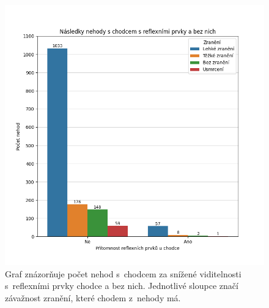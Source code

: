 \documentclass[a4paper, 11pt]{article}
\begin{document}
\begin{figure}[H]
    \centering
    \includegraphics[width=1.0\textwidth]{fig.png}
    \caption{Graf znázorňuje počet nehod s~chodcem za snížené viditelnosti s~reflexními prvky chodce a bez nich. Jednotlivé sloupce značí závažnost zranění, které chodem z~nehody má.}
    \label{fig:pocet_nehod}
\end{figure}
\end{document}
